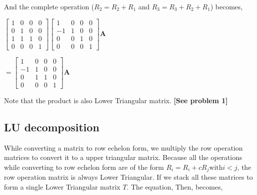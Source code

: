 \documentclass[a4paper]{article}
\begin{document}
            And the complete operation ($R_2 = R_2 + R_1$ and $R_3 = R_3 + R_2 + R_1$) becomes,
            
            \begin{center}
                $
                    \begin{bmatrix}
                    1  & 0 & 0 & 0 \\
                    0  & 1 & 0 & 0 \\
                    1  & 1 & 1 & 0 \\
                    0  & 0 & 0 & 1 
                    \end{bmatrix}
                    \begin{bmatrix}
                    1  & 0 & 0 & 0 \\
                    -1 & 1 & 0 & 0 \\
                    0  & 0 & 1 & 0 \\
                    0  & 0 & 0 & 1 
                    \end{bmatrix}
                    \mathbf{A}
                    $
                    
                    $
                    =
                    \begin{bmatrix}
                    1  & 0 & 0 & 0 \\
                    -1 & 1 & 0 & 0 \\
                    0  & 1 & 1 & 0 \\
                    0  & 0 & 0 & 1 
                    \end{bmatrix}
                    \mathbf{A}
                $
            \end{center}
            
            Note that the product is also Lower Triangular matrix. \textbf{[See problem 1]}
            
    \subsection{LU decomposition}
        While converting a matrix to row echelon form, we multiply the row operation matrices to convert it to a upper triangular matrix. Because all the operations while converting to row echelon form are of the form $R_i = R_i + cR_j \text{with} i<j$, the row operation matrix is always Lower Triangular. If we stack all these matrices to form a single Lower Triangular matrix $T$. The equation, Then, becomes,
        
\end{document}
